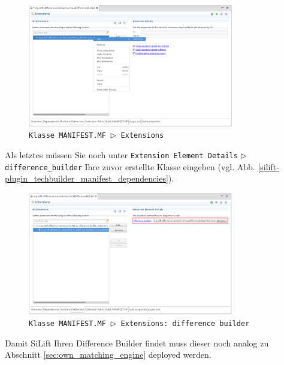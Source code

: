 \begin{figure}[H]
\centering
\includegraphics[width=0.8\textwidth]{techbuilder/graphics/silift-plugin_techbuilder_manifest_extension_point.png}
\caption{\texttt{Klasse \texttt{MANIFEST.MF} $\triangleright$  \texttt{Extensions}}}
\label{silift-plugin_techbuilder_manifest_extension_point}
\end{figure}

Als letztes müssen Sie noch unter \texttt{Extension Element Details} $\triangleright$ \texttt{difference\_builder} Ihre zuvor erstellte Klasse eingeben (vgl. Abb. \ref{silift-plugin_techbuilder_manifest_dependencies}).

\begin{figure}[H]
\centering
\includegraphics[width=0.8\textwidth]{techbuilder/graphics/silift-plugin_techbuilder_manifest_extension.png}
\caption{\texttt{Klasse \texttt{MANIFEST.MF} $\triangleright$  \texttt{Extensions}: \texttt{difference builder}}}
\label{silift-plugin_techbuilder_manifest_extension}
\end{figure}

Damit SiLift Ihren Difference Builder findet muss dieser noch analog zu Abschnitt \ref{sec:own_matching_engine} deployed werden.

